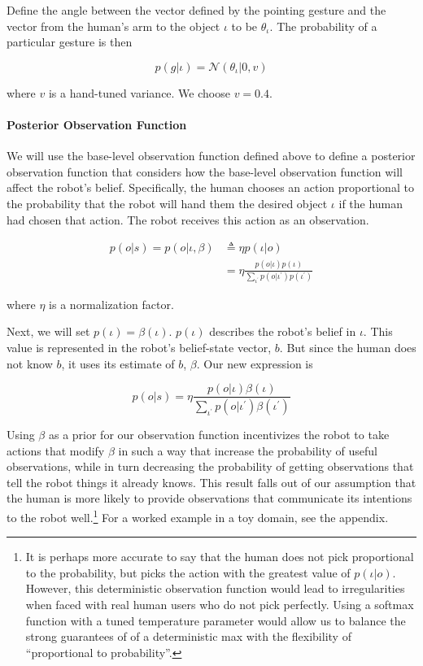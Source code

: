 \documentclass{article}
\begin{document}
\begin{multicols}{2}
Define the angle between the vector defined by the pointing gesture and the vector from the human's arm to the object $\iota$ to be $\theta_\iota$. The probability of a particular gesture is then

\begin{equation*}
p(g|\iota) = \mathcal{N}(\theta_\iota | 0, v)
\end{equation*}

where $v$ is a hand-tuned variance. We choose $v = 0.4$. 

\paragraph{Posterior Observation Function}

We will use the base-level observation function defined above to define a posterior observation function that considers how the base-level observation function will affect the robot's belief. Specifically, the human chooses an action proportional to the probability that the robot will hand them the desired object $\iota$ if the human had chosen that action. The robot receives this action as an observation. 

\begin{align*}
p(o|s) = p(o|\iota, \beta) &\triangleq \eta p(\iota|o) \\
&= \eta \frac{p(o|\iota) p(\iota)}{\sum_{\iota^\prime} p(o|\iota^\prime)p(\iota^\prime)} 
\end{align*}

where $\eta$ is a normalization factor. 

Next, we will set $p(\iota) = \beta(\iota)$. $p(\iota)$ describes the robot's belief in $\iota$. This value is represented in the robot's belief-state vector, $b$. But since the human does not know $b$, it uses its estimate of $b$, $\beta$. Our new expression is 


$$p(o|s) = \eta \frac{p(o|\iota) \beta(\iota)}{\sum_{\iota^\prime} p(o|\iota^\prime)\beta(\iota^\prime)} $$

Using $\beta$ as a prior for our observation function incentivizes the robot to take actions that modify $\beta$ in such a way that increase the probability of useful observations, while in turn decreasing the probability of getting observations that tell the robot things it already knows. This result falls out of our assumption that the human is more likely to provide observations that communicate its intentions to the robot well.\footnote{It is perhaps more accurate to say that the human does not pick proportional to the probability, but picks the action with the greatest value  of $p(\iota|o)$. However, this deterministic observation function would lead to irregularities when faced with real human users who do not pick perfectly. Using a softmax function with a tuned temperature parameter would allow us to balance the strong guarantees of of a deterministic max with the flexibility of ``proportional to probability''.}  For a worked example in a toy domain, see the appendix. 




\end{multicols}
\end{document}
